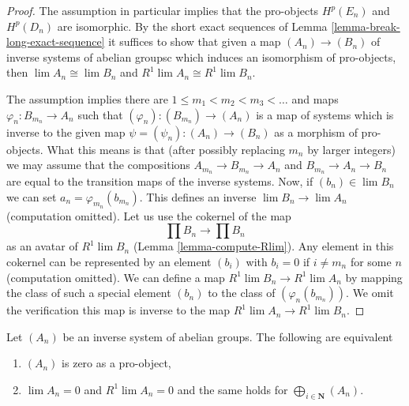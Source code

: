 \begin{proof}
The assumption in particular implies that the pro-objects
$H^p(E_n)$ and $H^p(D_n)$ are isomorphic. By the short exact sequences of
Lemma \ref{lemma-break-long-exact-sequence}
it suffices to show that given a map $(A_n) \to (B_n)$ of inverse
systems of abelian groupsc which induces an isomorphism
of pro-objects, then $\lim A_n \cong \lim B_n$ and
$R^1\lim A_n \cong R^1\lim B_n$.

\medskip\noindent
The assumption implies there are $1 \leq m_1 < m_2 < m_3 < \ldots$
and maps $\varphi_n : B_{m_n} \to A_n$ such that
$(\varphi_n) : (B_{m_n}) \to (A_n)$ is a map of systems
which is inverse to the given map $\psi = (\psi_n) : (A_n) \to (B_n)$
as a morphism of pro-objects. What this means is that
(after possibly replacing $m_n$ by larger integers) we may
assume that the compositions $A_{m_n} \to B_{m_n} \to A_n$ and
$B_{m_n} \to A_n \to B_n$ are equal to the transition maps
of the inverse systems. Now, if $(b_n) \in \lim B_n$ we can set
$a_n = \varphi_{m_n}(b_{m_n})$. This defines an inverse
$\lim B_n \to \lim A_n$ (computation omitted). Let us use the
cokernel of the map
$$
\prod B_n \longrightarrow \prod B_n
$$
as an avatar of $R^1\lim B_n$ (Lemma \ref{lemma-compute-Rlim}).
Any element in this cokernel can be represented by an element
$(b_i)$ with $b_i = 0$ if $i \not = m_n$ for some $n$ (computation omitted).
We can define a map $R^1\lim B_n \to R^1\lim A_n$ by mapping the class
of such a special element $(b_n)$ to the class of $(\varphi_n(b_{m_n}))$.
We omit the verification this map is inverse to the map
$R^1\lim A_n \to R^1\lim B_n$.
\end{proof}

\begin{lemma}
\label{lemma-Rlim-zero-of-direct-sums}
Let $(A_n)$ be an inverse system of abelian groups.
The following are equivalent
\begin{enumerate}
\item $(A_n)$ is zero as a pro-object,
\item $\lim A_n = 0$ and $R^1\lim A_n = 0$ and
the same holds for $\bigoplus_{i \in \mathbf{N}} (A_n)$.
\end{enumerate}
\end{lemma}

